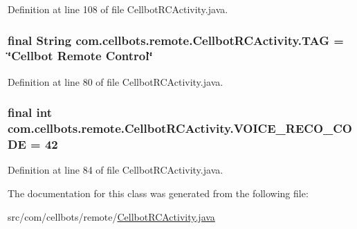 Definition at line 108 of file Cellbot\-R\-C\-Activity.\-java.

\hypertarget{classcom_1_1cellbots_1_1remote_1_1_cellbot_r_c_activity_a4f41df11fc7e72266c02d4eab0eba2dd}{
\subsubsection[{T\-A\-G}]{\setlength{\rightskip}{0pt plus 5cm}final String {\bf com.\-cellbots.\-remote.\-Cellbot\-R\-C\-Activity.\-T\-A\-G} = \char`\"{}Cellbot Remote Control\char`\"{}}}\label{classcom_1_1cellbots_1_1remote_1_1_cellbot_r_c_activity_a4f41df11fc7e72266c02d4eab0eba2dd}


Definition at line 80 of file Cellbot\-R\-C\-Activity.\-java.

\hypertarget{classcom_1_1cellbots_1_1remote_1_1_cellbot_r_c_activity_ac09782bdc4e6c867e06b09d79e1c9035}{
\subsubsection[{V\-O\-I\-C\-E\-\_\-\-R\-E\-C\-O\-\_\-\-C\-O\-D\-E}]{\setlength{\rightskip}{0pt plus 5cm}final int {\bf com.\-cellbots.\-remote.\-Cellbot\-R\-C\-Activity.\-V\-O\-I\-C\-E\-\_\-\-R\-E\-C\-O\-\_\-\-C\-O\-D\-E} = 42}}\label{classcom_1_1cellbots_1_1remote_1_1_cellbot_r_c_activity_ac09782bdc4e6c867e06b09d79e1c9035}


Definition at line 84 of file Cellbot\-R\-C\-Activity.\-java.



The documentation for this class was generated from the following file\-:\begin{DoxyCompactItemize}
\item 
src/com/cellbots/remote/\hyperlink{_cellbot_r_c_activity_8java}{Cellbot\-R\-C\-Activity.\-java}\end{DoxyCompactItemize}
